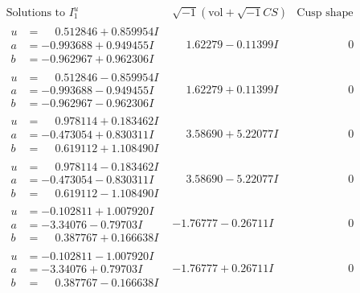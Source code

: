 \documentclass[1p]{elsarticle_modified}
\theoremstyle{definition}
\newcommand{\I}{\sqrt{-1}}
\begin{document}
$$\begin{array}{c|c|c}  
\text{Solutions to }I^u_{1}& \I (\text{vol} + \sqrt{-1}CS) & \text{Cusp shape}\\
 \hline 
\begin{aligned}
u &= \phantom{-}0.512846 + 0.859954 I \\
a &= -0.993688 + 0.949455 I \\
b &= -0.962967 + 0.962306 I\end{aligned}
 & \phantom{-}1.62279 - 0.11399 I & \phantom{-0.000000 } 0 \\ \hline\begin{aligned}
u &= \phantom{-}0.512846 - 0.859954 I \\
a &= -0.993688 - 0.949455 I \\
b &= -0.962967 - 0.962306 I\end{aligned}
 & \phantom{-}1.62279 + 0.11399 I & \phantom{-0.000000 } 0 \\ \hline\begin{aligned}
u &= \phantom{-}0.978114 + 0.183462 I \\
a &= -0.473054 + 0.830311 I \\
b &= \phantom{-}0.619112 + 1.108490 I\end{aligned}
 & \phantom{-}3.58690 + 5.22077 I & \phantom{-0.000000 } 0 \\ \hline\begin{aligned}
u &= \phantom{-}0.978114 - 0.183462 I \\
a &= -0.473054 - 0.830311 I \\
b &= \phantom{-}0.619112 - 1.108490 I\end{aligned}
 & \phantom{-}3.58690 - 5.22077 I & \phantom{-0.000000 } 0 \\ \hline\begin{aligned}
u &= -0.102811 + 1.007920 I \\
a &= -3.34076 - 0.79703 I \\
b &= \phantom{-}0.387767 + 0.166638 I\end{aligned}
 & -1.76777 - 0.26711 I & \phantom{-0.000000 } 0 \\ \hline\begin{aligned}
u &= -0.102811 - 1.007920 I \\
a &= -3.34076 + 0.79703 I \\
b &= \phantom{-}0.387767 - 0.166638 I\end{aligned}
 & -1.76777 + 0.26711 I & \phantom{-0.000000 } 0 \\ \hline\begin{aligned}

\end{aligned}
\end{array}$$
\end{document}
